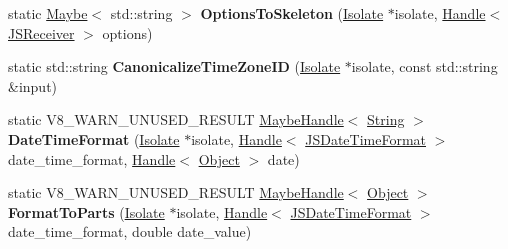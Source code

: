 \begin{DoxyCompactItemize}
\item 
\mbox{\label{classv8_1_1internal_1_1JSDateTimeFormat_a230aaaeed4a086853a3f200e8fbbf7c8}} 
static \mbox{\hyperlink{classv8_1_1Maybe}{Maybe}}$<$ std\+::string $>$ {\bfseries Options\+To\+Skeleton} (\mbox{\hyperlink{classv8_1_1internal_1_1Isolate}{Isolate}} $\ast$isolate, \mbox{\hyperlink{classv8_1_1internal_1_1Handle}{Handle}}$<$ \mbox{\hyperlink{classv8_1_1internal_1_1JSReceiver}{J\+S\+Receiver}} $>$ options)
\item 
\mbox{\label{classv8_1_1internal_1_1JSDateTimeFormat_a1062836bdd5a7c5c9daffc4d4bdbe29f}} 
static std\+::string {\bfseries Canonicalize\+Time\+Zone\+ID} (\mbox{\hyperlink{classv8_1_1internal_1_1Isolate}{Isolate}} $\ast$isolate, const std\+::string \&input)
\item 
\mbox{\label{classv8_1_1internal_1_1JSDateTimeFormat_a00feb94c76f62cc447d770b1ae4e4233}} 
static V8\+\_\+\+W\+A\+R\+N\+\_\+\+U\+N\+U\+S\+E\+D\+\_\+\+R\+E\+S\+U\+LT \mbox{\hyperlink{classv8_1_1internal_1_1MaybeHandle}{Maybe\+Handle}}$<$ \mbox{\hyperlink{classv8_1_1internal_1_1String}{String}} $>$ {\bfseries Date\+Time\+Format} (\mbox{\hyperlink{classv8_1_1internal_1_1Isolate}{Isolate}} $\ast$isolate, \mbox{\hyperlink{classv8_1_1internal_1_1Handle}{Handle}}$<$ \mbox{\hyperlink{classv8_1_1internal_1_1JSDateTimeFormat}{J\+S\+Date\+Time\+Format}} $>$ date\+\_\+time\+\_\+format, \mbox{\hyperlink{classv8_1_1internal_1_1Handle}{Handle}}$<$ \mbox{\hyperlink{classv8_1_1internal_1_1Object}{Object}} $>$ date)
\item 
\mbox{\label{classv8_1_1internal_1_1JSDateTimeFormat_a96d48fed53db47b44688b1117b7bbdb7}} 
static V8\+\_\+\+W\+A\+R\+N\+\_\+\+U\+N\+U\+S\+E\+D\+\_\+\+R\+E\+S\+U\+LT \mbox{\hyperlink{classv8_1_1internal_1_1MaybeHandle}{Maybe\+Handle}}$<$ \mbox{\hyperlink{classv8_1_1internal_1_1Object}{Object}} $>$ {\bfseries Format\+To\+Parts} (\mbox{\hyperlink{classv8_1_1internal_1_1Isolate}{Isolate}} $\ast$isolate, \mbox{\hyperlink{classv8_1_1internal_1_1Handle}{Handle}}$<$ \mbox{\hyperlink{classv8_1_1internal_1_1JSDateTimeFormat}{J\+S\+Date\+Time\+Format}} $>$ date\+\_\+time\+\_\+format, double date\+\_\+value)
\item 
\mbox{\label{classv8_1_1internal_1_1JSDateTimeFormat_a9d8c44eb4c00ce47584147ac8f82462d}} 

\end{DoxyCompactItemize}
